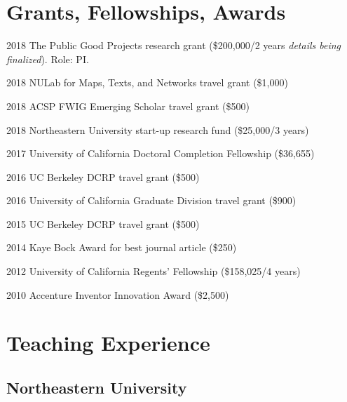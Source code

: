 \documentclass[12pt,letterpaper]{report}
\begin{document}
	
	
	\section*{Grants, Fellowships, Awards}
	
	
	\begin{tablist}
		
		\item[2018] \tab The Public Good Projects research grant (\$200,000/2 years \textit{details being finalized}). Role: PI.
		
		\item[2018] \tab NULab for Maps, Texts, and Networks travel grant (\$1,000)
		
		\item[2018] \tab ACSP FWIG Emerging Scholar travel grant (\$500)
		
		\item[2018] \tab Northeastern University start-up research fund (\$25,000/3 years)
		
		\item[2017] \tab University of California Doctoral Completion Fellowship (\$36,655)
		
		\item[2016] \tab UC Berkeley DCRP travel grant (\$500)
		
		\item[2016] \tab University of California Graduate Division travel grant (\$900)
		
		\item[2015] \tab UC Berkeley DCRP travel grant (\$500)
		
		\item[2014] \tab Kaye Bock Award for best journal article (\$250)
		
		\item[2012] \tab University of California Regents' Fellowship (\$158,025/4 years)
		
		\item[2010] \tab Accenture Inventor Innovation Award (\$2,500)
		
	\end{tablist}
	
	
	
	\section*{Teaching Experience}
	
	\subsection*{Northeastern University}
	
\end{document}
